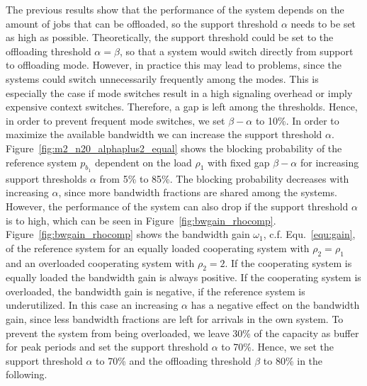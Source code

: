 The previous results show that the performance of the system depends on the amount of jobs that can be offloaded, so the support threshold $\alpha$ needs to be set as high as possible. Theoretically, the support threshold could be set to the offloading threshold $\alpha=\beta$, so that a system would switch directly from support to offloading mode. However, in practice this may lead to problems, since the systems could switch unnecessarily frequently among the modes. This is especially the case if mode switches result in a high signaling overhead or imply expensive context switches. Therefore, a gap is left among the thresholds.
Hence, in order to prevent frequent mode switches, we set $\beta - \alpha$ to 10\%. In order to maximize the available bandwidth we can increase the support threshold $\alpha$.
Figure~\ref{fig:m2_n20_alphaplus2_equal} shows the blocking probability of the reference system $p_{b_1}$ dependent on the load $\rho_1$ with fixed gap $\beta-\alpha$ for increasing support thresholds $\alpha$ from 5\% to 85\%. The blocking probability decreases with increasing $\alpha$, since more bandwidth fractions are shared among the systems.
However, the performance of the system can also drop if the support threshold $\alpha$ is to high, which can be seen in Figure~\ref{fig:bwgain_rhocomp}. Figure~\ref{fig:bwgain_rhocomp} shows the bandwidth gain $\omega_1$, c.f. Equ.~\ref{equ:gain}, of the reference system for an equally loaded cooperating system with $\rho_2=\rho_1$ and an overloaded cooperating system with $\rho_2=2$. If the cooperating system is equally loaded the bandwidth gain is always positive. If the cooperating system is overloaded, the bandwidth gain is negative, if the reference system is underutilized. In this case an increasing $\alpha$ has a negative effect on the bandwidth gain, since less bandwidth fractions are left for arrivals in the own system.
To prevent the system from being overloaded, we leave 30\% of the capacity as buffer for peak periods and set the support threshold $\alpha$ to 70\%.
Hence, we set the support threshold $\alpha$ to 70\% and the offloading threshold $\beta$ to 80\% in the following.


